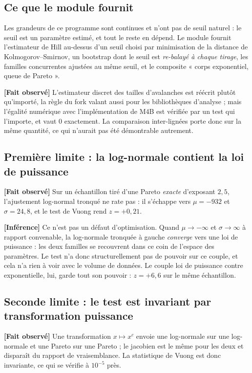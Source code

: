 \documentclass[11pt,a4paper]{article}
\newcommand{\fait}{\textbf{[Fait observé]}}
\newcommand{\inference}{\textbf{[Inférence]}}
\begin{document}
\subsection{Ce que le module fournit}

Les grandeurs de ce programme sont continues et n'ont pas de seuil naturel :
le seuil est un paramètre estimé, et tout le reste en dépend. Le module
fournit l'estimateur de Hill au-dessus d'un seuil choisi par minimisation de
la distance de Kolmogorov--Smirnov, un bootstrap dont le seuil est
\emph{re-balayé à chaque tirage}, les familles concurrentes ajustées au même
seuil, et le composite « corps exponentiel, queue de Pareto ».

\fait{} L'estimateur discret des tailles d'avalanches est réécrit plutôt
qu'importé, la règle du fork valant aussi pour les bibliothèques d'analyse ;
mais l'égalité numérique avec l'implémentation de M4B est vérifiée par un
test qui l'importe, et vaut $0$ exactement. La comparaison inter-lignées
porte donc sur la même quantité, ce qui n'aurait pas été démontrable
autrement.

\subsection{Première limite : la log-normale contient la loi de puissance}

\fait{} Sur un échantillon tiré d'une Pareto \emph{exacte} d'exposant
$2{,}5$, l'ajustement log-normal tronqué ne rate pas : il s'échappe vers
$\mu = -932$ et $\sigma = 24{,}8$, et le test de Vuong rend $z = +0{,}21$.

\inference{} Ce n'est pas un défaut d'optimisation. Quand $\mu \to -\infty$
et $\sigma \to \infty$ à rapport convenable, la log-normale tronquée à gauche
\emph{converge} vers une loi de puissance : les deux familles se recouvrent
dans ce coin de l'espace des paramètres. Le test n'a donc structurellement
pas de pouvoir sur ce couple, et cela n'a rien à voir avec le volume de
données. Le couple loi de puissance contre exponentielle, lui, garde tout son
pouvoir : $z = +6{,}6$ sur le même échantillon.

\subsection{Seconde limite : le test est invariant par transformation puissance}

\fait{} Une transformation $x \mapsto x^c$ envoie une log-normale sur une
log-normale et une Pareto sur une Pareto ; le jacobien est le même pour les
deux et disparaît du rapport de vraisemblance. La statistique de Vuong est
donc invariante, ce qui se vérifie à $10^{-5}$ près.
\end{document}
